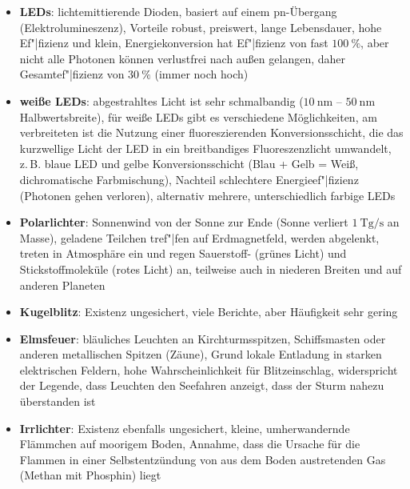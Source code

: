 \begin{itemize}
    \item
    \textbf{LEDs}:
    lichtemittierende Dioden,
    basiert auf einem pn-Übergang (Elektrolumineszenz),
    Vorteile robust, preiswert, lange Lebensdauer, hohe Ef"|fizienz und klein,
    Energiekonversion hat Ef"|fizienz von fast $\SI{100}{\percent}$, aber
    nicht alle Photonen können verlustfrei nach außen gelangen, daher
    Gesamtef"|fizienz von $\SI{30}{\percent}$ (immer noch hoch)

    \item
    \textbf{weiße LEDs}:
    abgestrahltes Licht ist sehr schmalbandig
    ($\SI{10}{\nano\meter}$ -- $\SI{50}{\nano\meter}$ Halbwertsbreite),
    für weiße LEDs gibt es verschiedene Möglichkeiten,
    am verbreiteten ist die Nutzung einer fluoreszierenden Konversionsschicht,
    die das kurzwellige Licht der LED in ein breitbandiges Fluoreszenzlicht
    umwandelt, z.\,B. blaue LED und gelbe Konversionsschicht
    (Blau + Gelb = Weiß, dichromatische Farbmischung),
    Nachteil schlechtere Energieef"|fizienz (Photonen gehen verloren),
    alternativ mehrere, unterschiedlich farbige LEDs
\end{itemize}
\linie
\begin{itemize}
    \item
    \textbf{Polarlichter}:
    Sonnenwind von der Sonne zur Ende
    (Sonne verliert $\SI{1}{\tera\gram\per\second}$ an Masse),
    geladene Teilchen tref"|fen auf Erdmagnetfeld, werden abgelenkt,
    treten in Atmosphäre ein und regen Sauerstoff- (grünes Licht) und
    Stickstoffmoleküle (rotes Licht) an,
    teilweise auch in niederen Breiten und auf anderen Planeten
\end{itemize}
\linie
\begin{itemize}
    \item
    \textbf{Kugelblitz}:
    Existenz ungesichert,
    viele Berichte, aber Häufigkeit sehr gering

    \item
    \textbf{Elmsfeuer}:
    bläuliches Leuchten an Kirchturmsspitzen, Schiffsmasten oder anderen
    metallischen Spitzen (Zäune),
    Grund lokale Entladung in starken elektrischen Feldern,
    hohe Wahrscheinlichkeit für Blitzeinschlag,
    widerspricht der Legende, dass Leuchten den Seefahren anzeigt, dass der
    Sturm nahezu überstanden ist

    \item
    \textbf{Irrlichter}:
    Existenz ebenfalls ungesichert,
    kleine, umherwandernde Flämmchen auf moorigem Boden,
    Annahme, dass die Ursache für die Flammen in einer Selbstentzündung von
    aus dem Boden austretenden Gas (Methan mit Phosphin) liegt
\end{itemize}

\pagebreak
